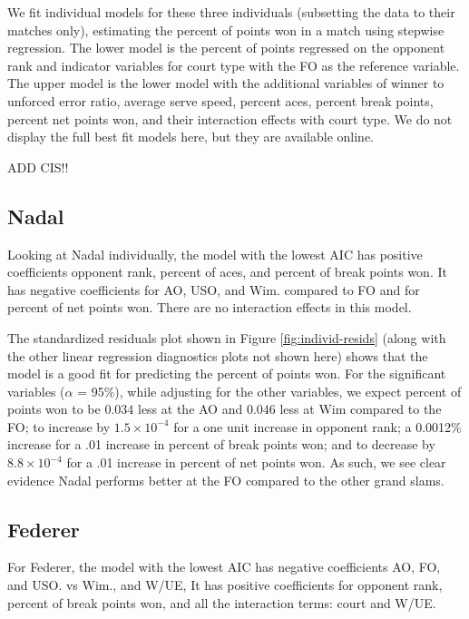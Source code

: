 \documentclass[]{article}
\begin{document}
We fit individual models for these three individuals (subsetting the
data to their matches only), estimating the percent of points won in a
match using stepwise regression. The lower model is the percent of
points regressed on the opponent rank and indicator variables for court
type with the FO as the reference variable. The upper model is the lower
model with the additional variables of winner to unforced error ratio,
average serve speed, percent aces, percent break points, percent net
points won, and their interaction effects with court type. We do not
display the full best fit models here, but they are available online.

ADD CIS!!

\hypertarget{nadal}{%
\subsection{Nadal}\label{nadal}}

Looking at Nadal individually, the model with the lowest AIC has
positive coefficients opponent rank, percent of aces, and percent of
break points won. It has negative coefficients for AO, USO, and Wim.
compared to FO and for percent of net points won. There are no
interaction effects in this model.

The standardized residuals plot shown in Figure \ref{fig:individ-resids}
(along with the other linear regression diagnostics plots not shown
here) shows that the model is a good fit for predicting the percent of
points won. For the significant variables (\(\alpha\) = 95\%), while
adjusting for the other variables, we expect percent of points won to be
\(0.034\) less at the AO and \(0.046\) less at Wim compared to the FO;
to increase by \(1.5\times 10^{-4}\) for a one unit increase in opponent
rank; a 0.0012\% increase for a .01 increase in percent of break points
won; and to decrease by \(8.8\times 10^{-4}\) for a .01 increase in
percent of net points won. As such, we see clear evidence Nadal performs
better at the FO compared to the other grand slams.

\hypertarget{federer}{%
\subsection{Federer}\label{federer}}

For Federer, the model with the lowest AIC has negative coefficients AO,
FO, and USO. vs Wim., and W/UE, It has positive coefficients for
opponent rank, percent of break points won, and all the interaction
terms: court and W/UE.
\end{document}
